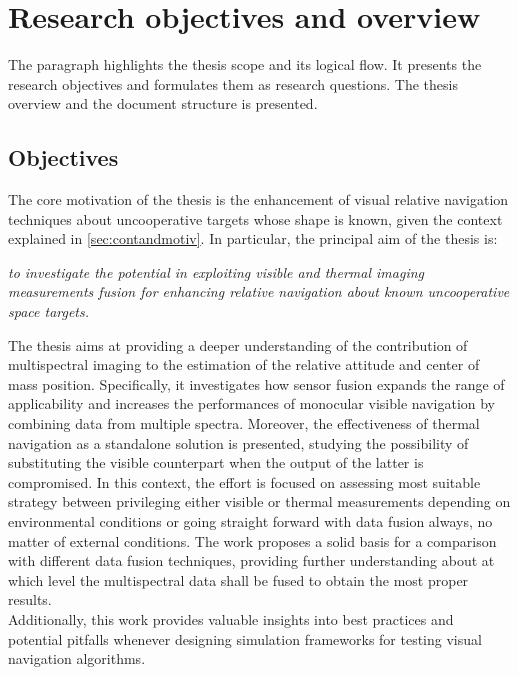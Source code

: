 \section{Research objectives and overview}
The paragraph highlights the thesis scope and its logical flow. It presents the research objectives and formulates them as research questions. The thesis overview and the document structure is presented.


\subsection{Objectives}
The core motivation of the thesis is the enhancement of visual relative navigation techniques about uncooperative targets whose shape is known, given the context explained in \cref{sec:contandmotiv}. In particular, the principal aim of the thesis is: 
\begin{tcolorbox}
\textit{to investigate the potential in exploiting visible and thermal imaging measurements fusion for enhancing relative navigation about known uncooperative space targets.}
\end{tcolorbox}

The thesis aims at providing a deeper understanding of the contribution of multispectral imaging to the estimation of the relative attitude and center of mass position. Specifically, it investigates how sensor fusion expands the range of applicability and increases the performances of monocular visible navigation by combining data from multiple spectra. Moreover, the effectiveness of thermal navigation as a standalone solution is presented, studying the possibility of substituting the visible counterpart when the output of the latter is compromised. In this context, 
the effort is focused on assessing most suitable strategy between privileging either visible or thermal measurements depending on environmental conditions or going straight forward with data fusion always, no matter of external conditions.
The work proposes a solid basis for a comparison with different data fusion techniques, providing further understanding about at which level the multispectral data shall be fused to obtain the most proper results.\\
Additionally, this work provides valuable insights into best practices and potential pitfalls whenever designing simulation frameworks for testing visual navigation algorithms.\\

